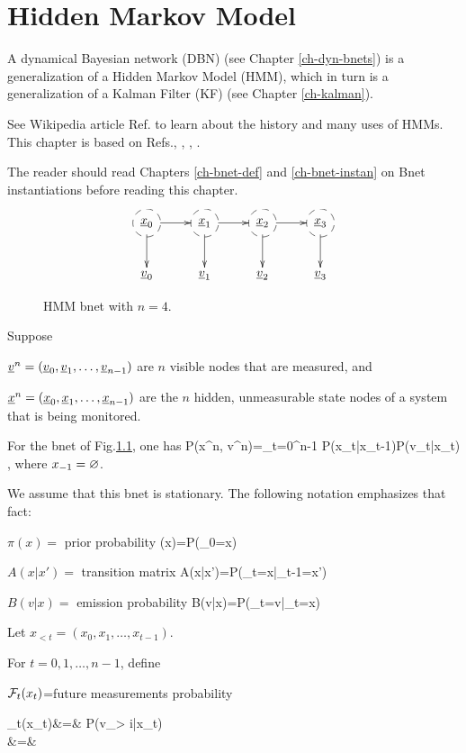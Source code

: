 \chapter{Hidden Markov Model}
\label{ch-hmm}

A dynamical Bayesian
network (DBN)  (see Chapter
\ref{ch-dyn-bnets})
is a generalization
of a
Hidden Markov Model (HMM), which
in turn is 
 a  generalization of a
Kalman Filter (KF) (see Chapter
\ref{ch-kalman}).

See Wikipedia article 
Ref.\cite{wiki-hmm} to learn 
about the history 
and many uses of HMMs. This
chapter is based on
Refs.\cite{nuel}, \cite{wiki-hmm},
\cite{wiki-viterbi}, \cite{wiki-baum}.

The reader should read Chapters \ref{ch-bnet-def}
and \ref{ch-bnet-instan}
on Bnet instantiations before reading this
chapter.


\begin{figure}[h!]
\centering
$$\xymatrix{
*++[F-o]{\rvx_0}\ar[d]\ar[r]&
*++[F-o]{\rvx_1}\ar[d]\ar[r]&
*++[F-o]{\rvx_2}\ar[d]\ar[r]&
*++[F-o]{\rvx_3}\ar[d]\\
\rvv_0&
\rvv_1&
\rvv_2&
\rvv_3
}$$
\caption{HMM bnet
with $n=4$.}
\label{fig-hmm}
\end{figure}

Suppose 

$\rvv^n=(\rvv_0, \rvv_1, 
\ldots, \rvv_{n-1})$
are $n$ visible nodes that
are measured,
and 

$\rvx^n=(\rvx_0, \rvx_1, 
\ldots, \rvx_{n-1})$
are the $n$ hidden, unmeasurable 
state nodes of a system
that is being monitored.



For the bnet of Fig.\ref{fig-hmm},
one has
\beq
P(x^n, v^n)=\prod_{t=0}^{n-1}
P(x_t|x_{t-1})P(v_t|x_t)
\;,
\eeq
where $x_{-1}=\varnothing$.

We assume that this bnet is stationary.
The following notation
emphasizes that fact:

$\pi(x)=$ prior probability
\beq
\pi(x)=P(\rvx_0=x)
\eeq

$A(x|x')=$ transition matrix
\beq
A(x|x')=P(\rvx_t=x|\rvx_{t-1}=x')
\eeq

$B(v|x)=$ emission probability
\beq
B(v|x)=P(\rvv_t=v|\rvx_t=x)
\eeq


Let
$x_{<t} =(x_0, x_1, \dots, x_{t-1})$.

For $t=0,1, \dots, n-1$, define

${\cal F}_t(x_t)$=future measurements probability

\beqa
\calf_t(x_t)&=&
P(v_{> i}|x_t)
\\
&=&
\bcen
{}
\ecen
\eeqa

